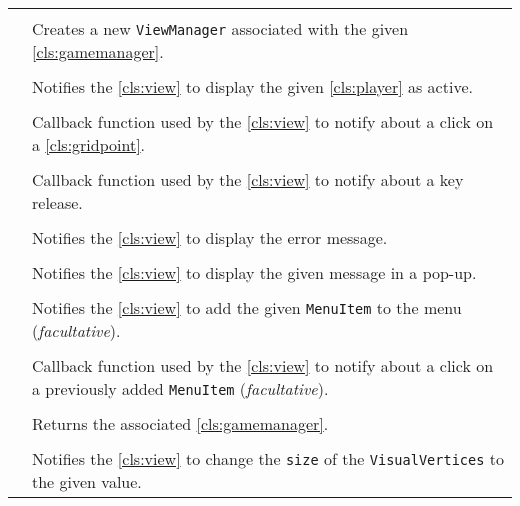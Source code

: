 \paragraph*{}
\begin{longtable}{Lp{10cm}}
	\startmethodtable
	 \\
	& Creates a new \texttt{ViewManager} associated with the given \ref{cls:gamemanager}. \\
	 \\
	& Notifies the \ref{cls:view} to display the given \ref{cls:player} as active. \\
	 \\
	& Callback function used by the \ref{cls:view} to notify about a click on a \ref{cls:gridpoint}.  \\
	 \\
	& Callback function used by the \ref{cls:view} to notify about a key release. \\
	 \\
	& Notifies the \ref{cls:view} to display the error message. \\
	 \\
	& Notifies the \ref{cls:view} to display the given message in a pop-up. \\
	 \\
	& Notifies the \ref{cls:view} to add the given \texttt{MenuItem} to the menu (\emph{facultative}). \\
	 \\
	& Callback function used by the \ref{cls:view} to notify about a click on a previously added \texttt{MenuItem} (\emph{facultative}).  \\
	 \\
	& Returns the associated \ref{cls:gamemanager}. \\
	 \\
	& Notifies the \ref{cls:view} to change the \texttt{size} of the \texttt{VisualVertices} to the given value. \\
	\hline
\end{longtable}

